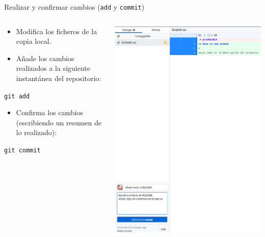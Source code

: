 \documentclass[xcolor={usenames,svgnames,dvipsnames}]{beamer}
\begin{document}
\begin{frame}[label={sec:org0b083c7},fragile]{Realizar y confirmar cambios (\texttt{add} y \texttt{commit})}
 \begin{columns}
\begin{column}{0.5\columnwidth}
\begin{itemize}
\item Modifica los ficheros de la copia local.
\item Añade los cambios realizados a la siguiente \guillemotleft{}instantánea\guillemotright{} del repositorio:
\end{itemize}
\begin{center}
\texttt{git add}
\end{center}
\begin{itemize}
\item Confirma los cambios (escribiendo un resumen de lo realizado):
\end{itemize}
\begin{center}
\texttt{git commit}
\end{center}
\end{column}

\begin{column}{0.5\columnwidth}
\begin{center}
\includegraphics[width=.9\linewidth]{figs/git_commit.png}
\end{center}
\end{column}
\end{columns}
\end{frame}
\end{document}
